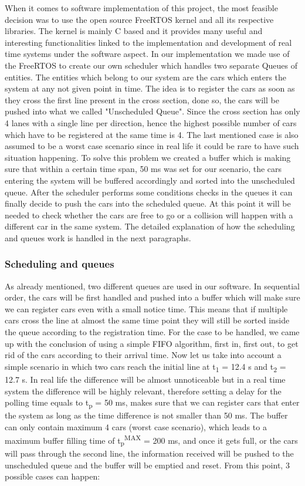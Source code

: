 \documentclass[conference]{IEEEtran}
\begin{document}
When it comes to software implementation of this project, the most feasible decision was to use the open source FreeRTOS kernel and all its respective libraries. The kernel is mainly C based and it provides many useful and interesting functionalities linked to the implementation and development of real time systems under the software aspect. In our implementation we made use of the FreeRTOS to create our own scheduler which handles two separate Queues of entities. The entities which belong to our system are the cars which enters the system at any not given point in time. The idea is to register the cars as soon as they cross the first line present in the cross section, done so, the cars will be pushed into what we called "Unscheduled Queue". Since the cross section has only 4 lanes with a single line per direction, hence the highest possible number of cars which have to be registered at the same time is 4. The last mentioned case is also assumed to be a worst case scenario since in real life it could be rare to have such situation happening. To solve this problem we created a buffer which is making sure that within a certain time span, 50 ms was set for our scenario, the cars entering the system will be buffered accordingly and sorted into the unscheduled queue. After the scheduler performs some conditions checks in the queues it can finally decide to push the cars into the scheduled queue. At this point it will be needed to check whether the cars are free to go or a collision will happen with a different car in the same system. The detailed explanation of how the scheduling and queues work is handled in the next paragraphs.

\subsubsection{Scheduling and queues}

As already mentioned, two different queues are used in our software. In sequential order, the cars will be first handled and pushed into a buffer which will make sure we can register cars even with a small notice time. This means that if multiple cars cross the line at almost the same time point they will still be sorted inside the queue according to the registration time. For the case to be handled, we came up with the conclusion of using a simple FIFO algorithm, first in, first out, to get rid of the cars according to their arrival time. Now let us take into account a simple scenario in which two cars reach the initial line at t\textsubscript{1} = 12.4 s and t\textsubscript{2} = 12.7 s. In real life the difference will be almost unnoticeable but in a real time system the difference will be highly relevant, therefore setting a delay for the polling time equals to t\textsubscript{p} = 50 ms, makes sure that we can register cars that enter the system as long as the time difference is not smaller than 50 ms. The buffer can only contain maximum 4 cars (worst case scenario), which leads to a maximum buffer filling time of
t\textsubscript{p}\textsuperscript{MAX} = 200 ms, and once it gets full, or the cars will pass through the second line, the information received will be pushed to the unscheduled queue and the buffer will be emptied and reset. From this point, 3 possible cases can happen:
\end{document}

